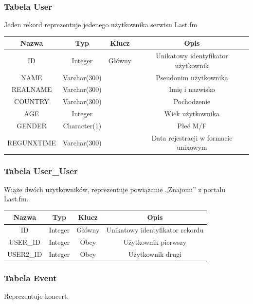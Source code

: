 \documentclass[10pt,a4paper]{article}
\begin{document}
\subsubsection{Tabela User}
Jeden rekord reprezentuje jedenego użytkownika serwisu Last.fm

\begin{table}[H]
  \centering
    \begin{tabular}{cccc}
    \addlinespace
    \toprule
    Nazwa & Typ   & Klucz & Opis \\
    \midrule
    ID    & Integer & Główny & Unikatowy identyfikator użytkownik \\
    NAME  & Varchar(300) &       & Pseudonim użytkownika \\
    REALNAME & Varchar(300) &       & Imię i nazwisko \\
    COUNTRY & Varchar(300) &       & Pochodzenie \\
    AGE   & Integer &       & Wiek użytkownika \\
    GENDER & Character(1) &       & Płeć M/F \\
    REGUNXTIME & Varchar(300) &       & Data rejestracji w formacie unixowym \\
    \bottomrule
    \end{tabular}
  \label{tab:addlabel}
\end{table}

\subsubsection {Tabela User\_User}
Wiąże dwóch użytkowników, reprezentuje powiązanie „Znajomi” z portalu Last.fm.

\begin{table}[H]
  \centering
    \begin{tabular}{cccc}
    \addlinespace
    \toprule
    Nazwa & Typ   & Klucz & Opis \\
    \midrule
    ID    & Integer & Główny & Unikatowy identyfikator rekordu \\
    USER\_ID & Integer & Obcy  & Użytkownik pierwszy \\
    USER2\_ID & Integer & Obcy  & Użytkownik drugi \\
    \bottomrule
    \end{tabular}
  \label{tab:addlabel}
\end{table}

\subsubsection {Tabela Event}
Reprezentuje koncert.
\end{document}
